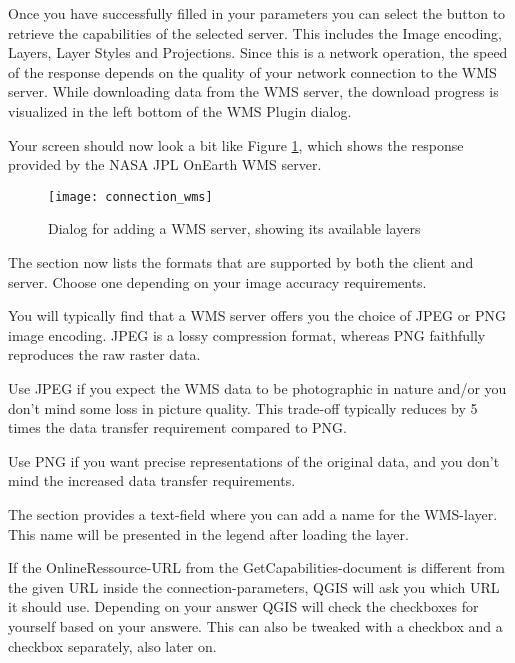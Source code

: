 Once you have successfully filled in your parameters you can select the
button to retrieve the capabilities of the selected server.  This includes the Image encoding,
Layers, Layer Styles and Projections.  Since this
is a network operation, the speed of the response depends on the quality of your network
connection to the WMS server. While downloading data from the WMS server, the download progress
is visualized in the left bottom of the WMS Plugin dialog.

Your screen should now look a bit like Figure \ref{fig:connection_wms}, which shows the
response provided by the NASA JPL OnEarth WMS server.

\begin{figure}[ht]
  \centering
  \texttt{[image: connection\_wms]}
  \caption{Dialog for adding a WMS server, showing its available layers \nixcaption}\label{fig:connection_wms}
\end{figure}


The  section now lists the formats that are supported by both
the client and server.  Choose one depending on your image accuracy requirements.

\begin{Tip}[ht]\caption{\textsc{Image Encoding}}
You will typically find that a WMS server offers you the choice
of JPEG or PNG image encoding.  JPEG is a lossy compression format,
whereas PNG faithfully reproduces the raw raster data.

Use JPEG if you expect the WMS data to be photographic in nature and/or you don't
mind some loss in picture quality.  This trade-off typically reduces by 5 times
the data transfer requirement compared to PNG.

Use PNG if you want precise representations of the original data, and you don't mind
the increased data transfer requirements.
\end{Tip}


The section provides a text-field where you can add a name
for the WMS-layer. This name will be presented in the legend after loading
the layer.

If the OnlineRessource-URL from the GetCapabilities-document is different
from the given URL inside the connection-parameters, QGIS will ask you
which URL it should use. Depending on your answer QGIS will check the
checkboxes for yourself based on your answere. This can also be tweaked with a
 checkbox and a
 checkbox separately, also later on.


